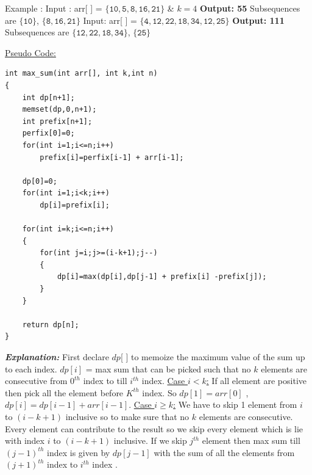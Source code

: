 \documentclass[12pt]{book}
\begin{document}
Example :\newline
Input : arr[ ] = $\mathtt{\{ 10, 5, 8, 16, 21\}}$ \& $k = 4$\newline
	\textbf{Output: 55}\newline 
		Subsequences are $\mathtt{\{ 10\}}$, $\mathtt{\{ 8, 16, 21\}}$\newline\newline
Input: arr[ ] = $\mathtt{\{ 4, 12, 22, 18, 34, 12, 25\}}$\newline
	\textbf{Output: 111}\newline 
		Subsequences are $\mathtt{\{ 12, 22, 18, 34\}}$, $\mathtt{\{ 25\}}$\newline\newline

\underline{Pseudo Code:}\newline
\begin{lstlisting}
int max_sum(int arr[], int k,int n)
{
	int dp[n+1];
	memset(dp,0,n+1);
	int prefix[n+1];
	perfix[0]=0;
	for(int i=1;i<=n;i++)
		prefix[i]=perfix[i-1] + arr[i-1];

	dp[0]=0;
	for(int i=1;i<k;i++)
		dp[i]=prefix[i];

	for(int i=k;i<=n;i++)
	{
		for(int j=i;j>=(i-k+1);j--)
		{
			dp[i]=max(dp[i],dp[j-1] + prefix[i] -prefix[j]);
		}
	}

	return dp[n];
}
\end{lstlisting}
\textbf{\textit{Explanation:}}\newline\newline
First declare $dp$[ ] to memoize the maximum value of the sum up to each index.\newline
$dp[i]$ = max sum that can be picked such that no $k$ elements are consecutive from $0^{th}$ index to till $i^{th}$ index.\newline
\underline{Case $i < k$:}\newline  
If all element are positive then pick all the element before $K^{th}$ index.\newline
So $dp[1] = arr[0]$ , $dp[i] = dp[i-1] + arr[i-1]$.\newline\newline
\underline{Case $i \geq k$:}\newline 
We have to skip 1 element from $i$ to $(i-k+1)$ inclusive so to make sure that no $k$ elements are consecutive.\newline
Every element can contribute to the result so we skip every element which is lie with index $i$ to $(i-k+1)$ inclusive. If we skip $j^{th}$ element then max sum till $(j-1)^{th}$ index is given by $dp[j-1]$ with the sum of all the elements from $(j + 1)^{th}$ index to $i^{th}$ index .\newline\newline
\end{document}
